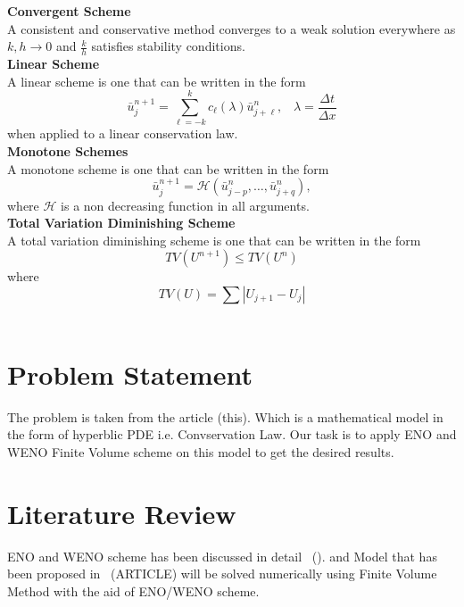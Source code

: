 \documentclass{article}
\begin{document}
\noindent \textbf{Convergent Scheme}\\
A consistent and conservative method converges to a weak solution everywhere as $k,h \longrightarrow 0$ and $\frac{k}{h}$ satisfies stability conditions.\\

\noindent \textbf{Linear Scheme}\\
A linear scheme is one that can be written in the form
\begin{equation}
\bar{u}_{j}^{n+1} = \sum_{\ell=-k}^{k} c_{\ell}(\lambda) \bar{u}_{j+\ell}^{n}, \;\;\;\lambda = \frac{\Delta t}{\Delta x}    
\end{equation}
\noindent when applied to a linear conservation law.\\

\noindent \textbf{Monotone Schemes}\\
A monotone scheme is one that can be written in the form
\begin{equation}
  \bar{u}_{j}^{n+1} = \mathcal{H}(\bar{u}_{j-p}^{n}, \dots, \bar{u}_{j+q}^{n}),
\end{equation}
\noindent where $\mathcal{H}$ is a non decreasing function in all arguments.\\

\noindent \textbf{Total Variation Diminishing Scheme}\\
A total variation diminishing scheme is one that can be written in the form
\begin{equation}
    TV(U^{n+1}) \leq TV(U^{n})
\end{equation}
\noindent where
\begin{equation}
    TV(U) = \sum |U_{j+1} - U_j|
\end{equation}
\\

\section{Problem Statement}
\noindent The problem is taken from the article (this). Which is a mathematical model in the form of hyperblic PDE i.e. Convservation Law. Our task is to apply ENO and WENO Finite Volume scheme on this model to get the desired results.

\section{Literature Review}
ENO and WENO scheme has been discussed in detail ~(\cite{shu_2020}). and Model that has been proposed in ~(ARTICLE) will be solved numerically using Finite Volume Method with the aid of ENO/WENO scheme.
\end{document}
